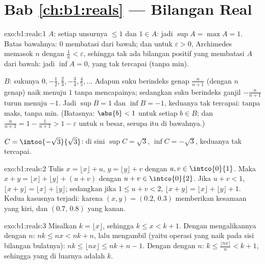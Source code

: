 \section*{Bab \ref{ch:b1:reals} --- Bilangan Real}

\begin{solution}{exo:b1:reals:1}
$A$: setiap unsurnya $\leq 1$ dan $1 \in A$: jadi $\sup A = \max A = 1$.
Batas bawahnya: $0$ membatasi dari bawah; dan untuk $\varepsilon > 0$, Archimedes
memasok $n$ dengan $\frac 1n < \varepsilon$, sehingga tak ada bilangan positif yang
membatasi $A$ dari bawah: jadi $\inf A = 0$, yang tak tercapai (tanpa min).

$B$: sukunya $0, -\frac12, \frac23, -\frac34, \frac45, \dots$ Adapun suku
berindeks genap $\frac{n}{n+1}$ (dengan $n$ genap) naik menuju $1$ tanpa mencapainya;
sedangkan suku berindeks ganjil $-\frac{n}{n+1}$ turun menuju $-1$. Jadi $\sup B = 1$ dan
$\inf B = -1$, keduanya tak tercapai: tanpa maks, tanpa min. (Batasnya: $\abs{b}
< 1$ untuk setiap $b \in B$; dan $\frac{n}{n+1} = 1 - \frac{1}{n+1} > 1 -
\varepsilon$ untuk $n$ besar, serupa itu di bawahnya.)

$C = \intoo{-\sqrt 3}{\sqrt 3}$: di sini $\sup C = \sqrt 3$, $\inf C =
-\sqrt 3$, keduanya tak tercapai.
\end{solution}

\begin{solution}{exo:b1:reals:2}
Tulis $x = \lfloor x \rfloor + u$, $y = \lfloor y \rfloor + v$ dengan
$u, v \in \intco{0}{1}$. Maka $x + y = \lfloor x \rfloor + \lfloor y
\rfloor + (u + v)$ dengan $u + v \in \intco{0}{2}$. Jika $u + v < 1$,
$\lfloor x + y\rfloor = \lfloor x\rfloor + \lfloor y \rfloor$; sedangkan jika
$1 \leq u + v < 2$, $\lfloor x+y \rfloor = \lfloor x \rfloor +
\lfloor y \rfloor + 1$. Kedua kasusnya terjadi: karena $(x, y) = (0.2,\, 0.3)$
memberikan kesamaan yang kiri, dan $(0.7,\, 0.8)$ yang kanan.
\end{solution}

\begin{solution}{exo:b1:reals:3}
Misalkan $k = \lfloor x \rfloor$, sehingga $k \leq x < k + 1$. Dengan mengalikannya dengan
$n$: $nk \leq nx < nk + n$, lalu mengambil  (yaitu operasi yang naik
pada sisi bilangan bulatnya): $nk \leq \lfloor nx \rfloor \leq nk + n
- 1$. Dengan  dengan $n$: $k \leq \frac{\lfloor nx \rfloor}{n} < k + 1$,
sehingga  yang di luarnya adalah $k$.
\end{solution}

